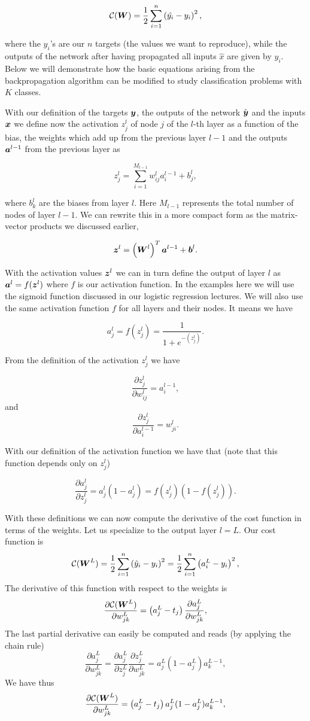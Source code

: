 $$\mathcal{C}({\boldsymbol{W}})  =  \frac{1}{2}\sum_{i=1}^n\left(\hat{y_i} - y_i\right)^2,$$

where the $y_i$'s are our $n$ targets (the values we want to
reproduce), while the outputs of the network after having propagated
all inputs $\hat{x}$ are given by $y_i$.  Below we will demonstrate
how the basic equations arising from the backpropagation algorithm
can be modified to study classification problems with $K$ classes.

With our definition of the targets ${\boldsymbol{y}}$, the outputs of the
network $\hat{{\boldsymbol{y}}}$ and the inputs ${\boldsymbol{x}}$ we
define now the activation $z_j^l$ of node $j$ of the
$l$-th layer as a function of the bias, the weights which add up from
the previous layer $l-1$ and the outputs
${\boldsymbol{a}}^{l-1}$ from the previous layer as

$$z_j^l = \sum_{i=1}^{M_{l-1}}w_{ij}^la_i^{l-1}+b_j^l,$$

where $b_k^l$ are the biases from layer $l$.  Here $M_{l-1}$
represents the total number of nodes of layer $l-1$. 
We can rewrite this in a more compact form as the matrix-vector products 
we discussed earlier,

$${\boldsymbol{z}}^l = \left({\boldsymbol{W}}^l\right)^T{\boldsymbol{a}}^{l-1}+{\boldsymbol{b}}^l.$$

With the activation values ${\boldsymbol{z}}^l$ we can in turn define the
output of layer $l$ as ${\boldsymbol{a}}^l = f({\boldsymbol{z}}^l)$ where $f$ is our
activation function. In the examples here we will use the sigmoid
function discussed in our logistic regression lectures. We will also use the same activation function $f$ for all layers
and their nodes.  It means we have

$$a_j^l = f(z_j^l) = \frac{1}{1+e^{-(z_j^l)}}.$$

\noindent From the definition of the activation $z_j^l$ we have

$$\frac{\partial z_j^l}{\partial w_{ij}^l} = a_i^{l-1},$$
and
$$\frac{\partial z_j^l}{\partial a_i^{l-1}} = w_{ji}^l.$$

\noindent With our definition of the activation function we have that (note that this function depends only on $z_j^l$)

$$\frac{\partial a_j^l}{\partial z_j^{l}} = a_j^l(1-a_j^l)=f(z_j^l)(1-f(z_j^l)).$$

\noindent With these definitions we can now compute the derivative of the cost function in terms of the weights.
Let us specialize to the output layer $l=L$. Our cost function is
$$\mathcal{C}({\boldsymbol{W}}^L)  =  \frac{1}{2}\sum_{i=1}^n\left(\hat{y}_i - y_i\right)^2=\frac{1}{2}\sum_{i=1}^n\left(a_i^L - y_i\right)^2,$$
The derivative of this function with respect to the weights is
$$\frac{\partial \mathcal{C}({\boldsymbol{W}}^L)}{\partial w_{jk}^L}  =  \left(a_j^L - t_j\right)\frac{\partial a_j^L}{\partial w_{jk}^{L}},$$
The last partial derivative can easily be computed and reads (by applying the chain rule)
$$\frac{\partial a_j^L}{\partial w_{jk}^{L}} = \frac{\partial a_j^L}{\partial z_{j}^{L}}\frac{\partial z_j^L}{\partial w_{jk}^{L}}=a_j^L(1-a_j^L)a_k^{L-1},$$
We have thus
$$\frac{\partial \mathcal{C}({\boldsymbol{W}}^L)}{\partial w_{jk}^L}  =  \left(a_j^L - t_j\right)a_j^L(1-a_j^L)a_k^{L-1},$$

